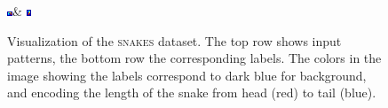 \begin{figure}
\begin{tabu}
    \includegraphics[width=\linewidth]{evaluation/images/snake_label_0006}&%
    \includegraphics[width=\linewidth]{evaluation/images/snake_label_0007}
    \end{tabu}
\caption{%
    Visualization of the \textsc{snakes} dataset. The top row shows input patterns, the bottom row the corresponding
    labels. The colors in the image showing the labels correspond to dark blue for background, and encoding
    the length of the snake from head (red) to tail (blue).
}
\end{figure}

